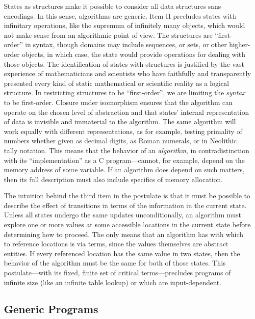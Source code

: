 \documentclass[submission,copyright,creativecommons,english]{eptcs}
\begin{document}
States as structures make it possible to consider all data structures sans encodings.
In this sense, algorithms are generic.
Item II precludes states with infinitary operations, like the supremum of infinitely many objects, which would not make sense from an algorithmic point of view. 
The structures are ``first-order'' in syntax, though
domains may include sequences, or sets, or other higher-order objects, in which case, the state would provide operations for dealing with those objects.
The identification of states with structures is justified by the vast experience of mathematicians and scientists who have faithfully and transparently
presented every kind of static mathematical or scientific reality as a logical structure.
In restricting structures to be ``first-order'', we are limiting the \emph{syntax} to be first-order. 
Closure under isomorphism ensures that the algorithm can
operate on the chosen level of abstraction and that
states' internal representation of data is invisible and immaterial to the algorithm.
The same algorithm will work equally with different representations, as
for example, testing primality of numbers whether given as decimal digits, as Roman numerals, or in Neolithic tally notation.
This means that the behavior of an \textit{algorithm}, in contradistinction with its ``implementation'' as a C program---cannot,
for example, depend on the memory address of some variable. 
If an algorithm does depend on such matters, then its full description must also include specifics of memory allocation.

The intuition behind the third item in the postulate is that it must be possible to describe the effect of transitions in
terms of the information in the current state.
Unless all states undergo the same updates unconditionally, an algorithm must
explore one or more values at some accessible locations in the current state before determining how to proceed.
The only means that an algorithm has with which to reference locations is via terms,
since the values themselves are abstract entities.
If every referenced location has the same value in two states,
then the behavior of the algorithm must be the same for both of those states.
This postulate---with its fixed, finite set of critical terms---precludes programs of infinite size (like an infinite table lookup) or which 
are input-dependent.


\subsection{Generic Programs}
\end{document}
